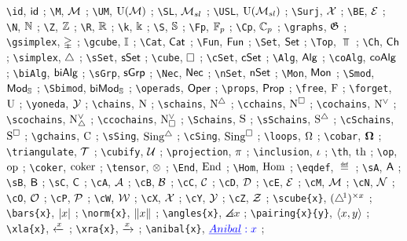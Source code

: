 \verb|\id|, $\id$ ; 
\verb|\M|, $\M$ ; 
\verb|\UM|, $\UM$ ; 
\verb|\SL|, $\SL$ ; 
\verb|\USL|, $\USL$ ; 
\verb|\Surj|, $\Surj$ ; 
\verb|\BE|, $\BE$ ; 
\verb|\N|, $\N$ ; 
\verb|\Z|, $\Z$ ; 
\verb|\R|, $\R$ ; 
\verb|\k|, $\k$ ; 
\verb|\S|, $\S$ ; 
\verb|\Fp|, $\Fp$ ; 
\verb|\Cp|, $\Cp$ ; 
\verb|\graphs|, $\graphs$ ; 
\verb|\gsimplex|, $\gsimplex$ ; 
\verb|\gcube|, $\gcube$ ; 
\verb|\Cat|, $\Cat$ ; 
\verb|\Fun|, $\Fun$ ; 
\verb|\Set|, $\Set$ ; 
\verb|\Top|, $\Top$ ; 
\verb|\Ch|, $\Ch$ ; 
\verb|\simplex|, $\simplex$ ; 
\verb|\sSet|, $\sSet$ ; 
\verb|\cube|, $\cube$ ; 
\verb|\cSet|, $\cSet$ ; 
\verb|\Alg|, $\Alg$ ; 
\verb|\coAlg|, $\coAlg$ ; 
\verb|\biAlg|, $\biAlg$ ; 
\verb|\sGrp|, $\sGrp$ ; 
\verb|\Nec|, $\Nec$ ; 
\verb|\nSet|, $\nSet$ ; 
\verb|\Mon|, $\Mon$ ; 
\verb|\Smod|, $\Smod$ ; 
\verb|\Sbimod|, $\Sbimod$ ; 
\verb|\operads|, $\operads$ ; 
\verb|\props|, $\props$ ; 
\verb|\free|, $\free$ ; 
\verb|\forget|, $\forget$ ; 
\verb|\yoneda|, $\yoneda$ ; 
\verb|\chains|, $\chains$ ; 
\verb|\schains|, $\schains$ ; 
\verb|\cchains|, $\cchains$ ; 
\verb|\cochains|, $\cochains$ ; 
\verb|\scochains|, $\scochains$ ; 
\verb|\ccochains|, $\ccochains$ ; 
\verb|\Schains|, $\Schains$ ; 
\verb|\sSchains|, $\sSchains$ ; 
\verb|\cSchains|, $\cSchains$ ; 
\verb|\gchains|, $\gchains$ ; 
\verb|\sSing|, $\sSing$ ; 
\verb|\cSing|, $\cSing$ ; 
\verb|\loops|, $\loops$ ; 
\verb|\cobar|, $\cobar$ ; 
\verb|\triangulate|, $\triangulate$ ; 
\verb|\cubify|, $\cubify$ ; 
\verb|\projection|, $\projection$ ; 
\verb|\inclusion|, $\inclusion$ ; 
\verb|\th|, $\th$ ; 
\verb|\op|, $\op$ ; 
\verb|\coker|, $\coker$ ; 
\verb|\tensor|, $\tensor$ ; 
\verb|\End|, $\End$ ; 
\verb|\Hom|, $\Hom$ ; 
\verb|\eqdef|, $\eqdef$ ; 
\verb|\sA|, $\sA$ ; 
\verb|\sB|, $\sB$ ; 
\verb|\sC|, $\sC$ ; 
\verb|\cA|, $\cA$ ; 
\verb|\cB|, $\cB$ ; 
\verb|\cC|, $\cC$ ; 
\verb|\cD|, $\cD$ ; 
\verb|\cE|, $\cE$ ; 
\verb|\cM|, $\cM$ ; 
\verb|\cN|, $\cN$ ; 
\verb|\cO|, $\cO$ ; 
\verb|\cP|, $\cP$ ; 
\verb|\cW|, $\cW$ ; 
\verb|\cX|, $\cX$ ; 
\verb|\cY|, $\cY$ ; 
\verb|\cZ|, $\cZ$ ; 
\verb|\scube{x}|, $\scube{x}$ ; 
\verb|\bars{x}|, $\bars{x}$ ; 
\verb|\norm{x}|, $\norm{x}$ ; 
\verb|\angles{x}|, $\angles{x}$ ; 
\verb|\pairing{x}{y}|, $\pairing{x}{y}$ ; 
\verb|\xla{x}|, $\xla{x}$ ; 
\verb|\xra{x}|, $\xra{x}$ ; 
\verb|\anibal{x}|, $\anibal{x}$ ; 
